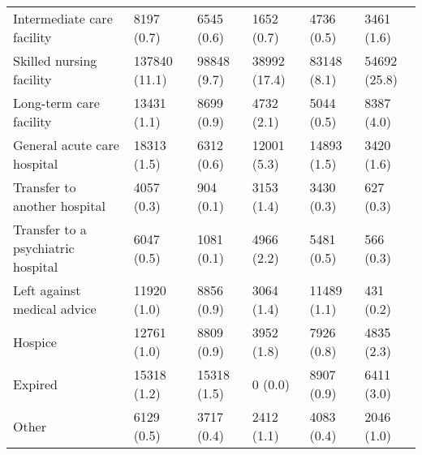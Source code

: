 \begin{adjustbox}{width={\textwidth},totalheight={\textheight},keepaspectratio,frame}
{\begin{tabular}{L{20em}C{10em}C{10em}C{10em}C{10em}C{10em}}
\hspace{3mm}         Intermediate care facility &         8197 (0.7) &                    6545 (0.6) &                1652 (0.7) &                     4736 (0.5) &                3461 (1.6) \\
\hspace{3mm}           Skilled nursing facility &      137840 (11.1) &                   98848 (9.7) &              38992 (17.4) &                    83148 (8.1) &              54692 (25.8) \\
\hspace{3mm}            Long-term care facility &        13431 (1.1) &                    8699 (0.9) &                4732 (2.1) &                     5044 (0.5) &                8387 (4.0) \\
\hspace{3mm}        General acute care hospital &        18313 (1.5) &                    6312 (0.6) &               12001 (5.3) &                    14893 (1.5) &                3420 (1.6) \\
\hspace{3mm}       Transfer to another hospital &         4057 (0.3) &                     904 (0.1) &                3153 (1.4) &                     3430 (0.3) &                 627 (0.3) \\
\hspace{3mm} Transfer to a psychiatric hospital &         6047 (0.5) &                    1081 (0.1) &                4966 (2.2) &                     5481 (0.5) &                 566 (0.3) \\
\hspace{3mm}        Left against medical advice &        11920 (1.0) &                    8856 (0.9) &                3064 (1.4) &                    11489 (1.1) &                 431 (0.2) \\
\hspace{3mm}                            Hospice &        12761 (1.0) &                    8809 (0.9) &                3952 (1.8) &                     7926 (0.8) &                4835 (2.3) \\
\hspace{3mm}                            Expired &        15318 (1.2) &                   15318 (1.5) &                   0 (0.0) &                     8907 (0.9) &                6411 (3.0) \\
\hspace{3mm}                              Other &         6129 (0.5) &                    3717 (0.4) &                2412 (1.1) &                     4083 (0.4) &                2046 (1.0) \\

\end{tabular}}
\end{adjustbox}
